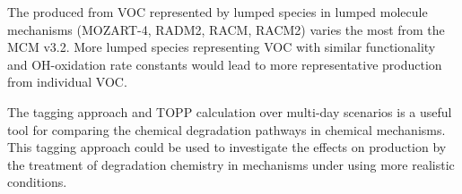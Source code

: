 The  produced from VOC represented by lumped species in lumped molecule mechanisms (MOZART-4, RADM2, RACM, RACM2) varies the most from the MCM v3.2.
More lumped species representing VOC with similar functionality and OH-oxidation rate constants would lead to more representative  production from individual VOC.

The tagging approach and TOPP calculation over multi-day scenarios is a useful tool for comparing the chemical degradation pathways in chemical mechanisms. 
This tagging approach could be used to investigate the effects on  production by the treatment of degradation chemistry in mechanisms under using more realistic  conditions.
